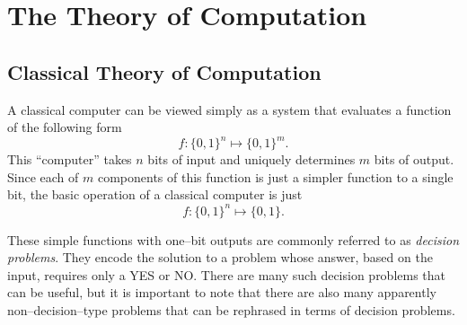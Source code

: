 
\section{The Theory of Computation}


\subsection{Classical Theory of Computation}
\label{ssec:classicalComp}

A classical computer can be viewed simply as a
system that evaluates a function of the following
form
\begin{equation}
f\colon\lbrace 0,1\rbrace^n \mapsto \lbrace 0,1\rbrace^m.
\end{equation}
This ``computer'' takes $n$ bits of input and uniquely
determines $m$ bits of output.
Since each of $m$ components of this function is just a 
simpler function to a single bit,
the basic operation of a classical computer is just 
\begin{equation}
f\colon\lbrace 0,1\rbrace^n \mapsto \lbrace 0,1\rbrace.
\end{equation}

These simple functions with one--bit outputs are commonly
referred to as \emph{decision problems}.
They encode the solution to a problem whose answer, based on
the input, requires only a YES or NO.  There are many such
decision problems that can be useful, but it is important to note
that there are also many apparently non--decision--type problems 
that can be rephrased in terms of decision problems.  

